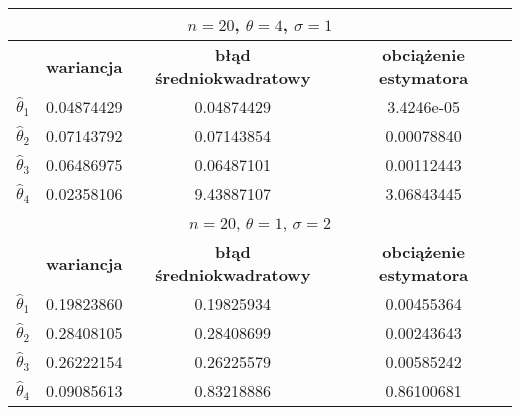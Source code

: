 \documentclass[a4paper]{article}
\begin{document}
\begin{table}[H]
\centering
\begin{tabular}{|c|c|c|c|}
\hline
\multicolumn{4}{|c|}{$n=20$, $\theta=4$, $\sigma=1$} \\ \hline
                  & \textbf{wariancja}   & \textbf{błąd średniokwadratowy} & \textbf{obciążenie estymatora} \\ \hline
$\hat{\theta}_1$ & 0.04874429 & 0.04874429 & 3.4246e-05 \\ \hline
$\hat{\theta}_2$ & 0.07143792 & 0.07143854 & 0.00078840 \\ \hline
$\hat{\theta}_3$ & 0.06486975 & 0.06487101 & 0.00112443 \\ \hline
$\hat{\theta}_4$ & 0.02358106 & 9.43887107 & 3.06843445 \\ \hline

\multicolumn{4}{|c|}{$n=20$, $\theta=1$, $\sigma=2$} \\ \hline
                  & \textbf{wariancja}   & \textbf{błąd średniokwadratowy} & \textbf{obciążenie estymatora} \\ \hline
$\hat{\theta}_1$ & 0.19823860 & 0.19825934 & 0.00455364 \\ \hline
$\hat{\theta}_2$ & 0.28408105 & 0.28408699 & 0.00243643 \\ \hline
$\hat{\theta}_3$ & 0.26222154 & 0.26225579 & 0.00585242 \\ \hline
$\hat{\theta}_4$ & 0.09085613 & 0.83218886 & 0.86100681 \\ \hline
\end{tabular}
\end{table}
\end{document}
